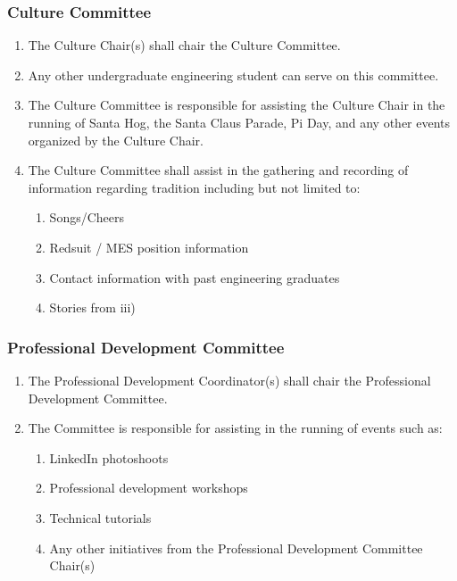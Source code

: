 \subsubsection{Culture Committee}
\label{culture-committee}
\begin{enumerate}
 \item
  The Culture Chair(s) shall chair the Culture Committee.
 \item
  Any other undergraduate engineering student can serve on this committee.
 \item
  The Culture Committee is responsible for assisting the Culture Chair in the running of Santa Hog, the Santa Claus Parade, Pi Day, and any other events organized by the Culture Chair.
 \item
  The Culture Committee shall assist in the gathering and recording of information regarding tradition including but not limited to:

  \begin{enumerate}
   \item
    Songs/Cheers
   \item
    Redsuit / MES position information
   \item
    Contact information with past engineering graduates
   \item
    Stories from iii)

  \end{enumerate}
\end{enumerate}

\subsubsection{Professional Development Committee}
\label{professional-development-committee}
\begin{enumerate}
 \item
  The Professional Development Coordinator(s) shall chair the Professional Development Committee.
 \item
  The Committee is responsible for assisting in the running of events such as:

  \begin{enumerate}
   \item
    LinkedIn photoshoots
   \item
    Professional development workshops
   \item
    Technical tutorials
   \item
    Any other initiatives from the Professional Development Committee Chair(s)
  \end{enumerate}
\end{enumerate}

